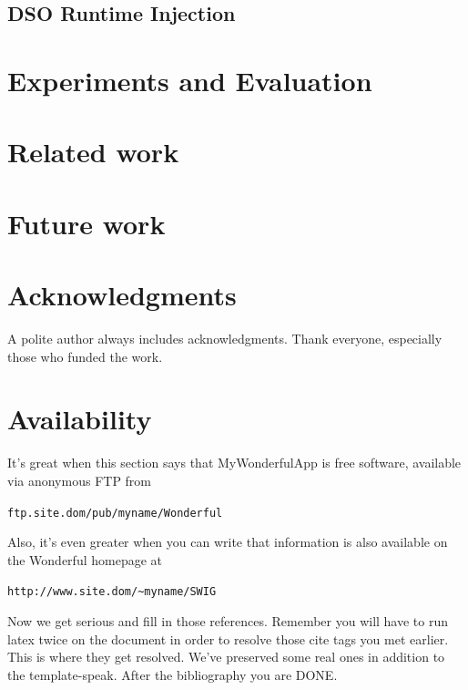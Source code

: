\documentclass[letterpaper,twocolumn,10pt]{article}
\begin{document}
\subsection{DSO Runtime Injection} \label{sec:dso}

\section{Experiments and Evaluation}

\section{Related work}

\section{Future work}

\section{Acknowledgments}

A polite author always includes acknowledgments.  Thank everyone,
especially those who funded the work. 

\section{Availability}

It's great when this section says that MyWonderfulApp is free software, 
available via anonymous FTP from

\begin{center}
{\tt ftp.site.dom/pub/myname/Wonderful}\\
\end{center}

Also, it's even greater when you can write that information is also 
available on the Wonderful homepage at 

\begin{center}
{\tt http://www.site.dom/\~{}myname/SWIG}
\end{center}

Now we get serious and fill in those references.  Remember you will
have to run latex twice on the document in order to resolve those
cite tags you met earlier.  This is where they get resolved.
We've preserved some real ones in addition to the template-speak.
After the bibliography you are DONE.

{\footnotesize 
}


\theendnotes
\end{document}
